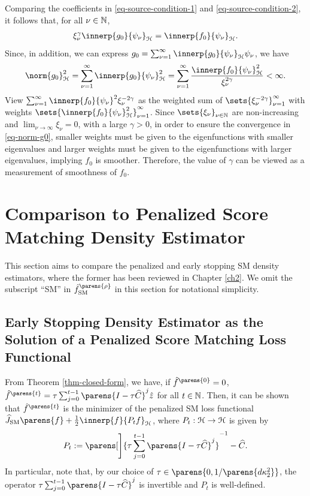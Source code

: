 Comparing the coefficients in \eqref{eq-source-condition-1} and \eqref{eq-source-condition-2}, it follows that, for all $\nu \in \mathbb{N}$, 
\begin{align*}
	\xi_{\nu}^\gamma \innerp{g_0}{\psi_{\nu}}_{\calH} = \innerp{f_0}{\psi_{\nu}}_{\calH}. 
\end{align*}
Since, in addition, we can express $g_0 = \sum_{\nu=1}^{\infty} \innerp{g_0}{\psi_{\nu}}_{\calH} \psi_{\nu}$, we have
\begin{align}\label{eq-norm-g0}
	\norm{g_0}_{\calH}^2 = \sum_{\nu=1}^{\infty} \innerp{g_0}{\psi_{\nu}}_{\calH}^2 = \sum_{\nu=1}^\infty \frac{\innerp{f_0}{\psi_{\nu}}_{\calH}^2}{\xi_{\nu}^{2\gamma}} < \infty. 
\end{align}
View $\sum_{\nu=1}^\infty \innerp{f_0}{\psi_{\nu}}^2 \xi_{\nu}^{-2\gamma}$ as the weighted sum of $\sets{\xi_{\nu}^{-2\gamma}}_{\nu=1}^\infty$ with weights $\sets{\innerp{f_0}{\psi_{\nu}}_{\calH}^2}_{\nu=1}^\infty$. Since $\sets{\xi_{\nu}}_{\nu \in \Natural}$ are non-increasing and $\lim_{\nu \to \infty} \xi_{\nu} = 0$, with a large $\gamma > 0$, in order to ensure the convergence in \eqref{eq-norm-g0}, smaller weights must be given to the eigenfunctions with smaller eigenvalues and larger weights must be given to the eigenfunctions with larger eigenvalues, implying $f_0$ is smoother. Therefore, the value of $\gamma$ can be viewed as a measurement of smoothness of $f_0$. 	


\section{Comparison to Penalized Score Matching Density Estimator} \label{section-compare-smes-smpen}

This section aims to compare the penalized and early stopping SM density estimators, where the former has been reviewed in Chapter \ref{ch2}. We omit the subscript ``SM'' in $\hat{f}^{\parens{\rho}}_{\SM}$ in this section for notational simplicity. 

\subsection{Early Stopping Density Estimator as the Solution of a Penalized Score Matching Loss Functional}

From Theorem \ref{thm-closed-form}, we have, if $\hat{f}^{\parens{0}} = 0$, $\hat{f}^{\parens{t}} = \tau \sum_{j=0}^{t-1} \parens{I - \tau \widehat{C}}^j \hat{z}$ for all $t \in \mathbb{N}$. Then, it can be shown that $\hat{f}^{\parens{t}}$ is the minimizer of the penalized SM loss functional $\widehat{J}_{\SM} \parens{f} + \frac{1}{2} \innerp{f}{P_t f}_{\calH}$, where $P_t: \mathcal{H} \to \mathcal{H}$ is given by 
\begin{align*}
	P_t := \parens[\Bigg]{\tau \sum_{j=0}^{t-1} \parens{I - \tau \widehat{C}}^j}^{-1} - \widehat{C}. 
\end{align*}
In particular, note that, by our choice of $\tau \in \parens{0, 1/\parens{d \kappa_2^2}}$, the operator $\tau \sum_{j=0}^{t-1} \parens{I - \tau \widehat{C}}^j$ is invertible and $P_t$ is well-defined. 

